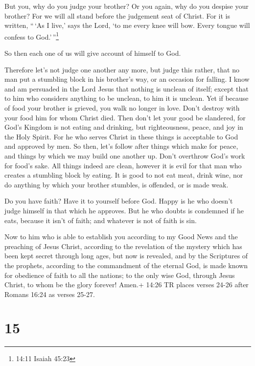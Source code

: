  But you, why do you judge your brother? Or you again, why
do you despise your brother? For we will all stand before the judgement
seat of Christ.  For it is written, ``\,`As I live,' says
the Lord, `to me every knee will bow. Every tongue will confess to
God.'\,''\footnote{14:11 Isaiah 45:23}

 So then each one of us will give account of himself to
God.

 Therefore let's not judge one another any more, but judge
this rather, that no man put a stumbling block in his brother's way, or
an occasion for falling.  I know and am persuaded in the
Lord Jesus that nothing is unclean of itself; except that to him who
considers anything to be unclean, to him it is unclean. 
Yet if because of food your brother is grieved, you walk no longer in
love. Don't destroy with your food him for whom Christ died.
 Then don't let your good be slandered,  for
God's Kingdom is not eating and drinking, but righteousness, peace, and
joy in the Holy Spirit.  For he who serves Christ in these
things is acceptable to God and approved by men.  So then,
let's follow after things which make for peace, and things by which we
may build one another up.  Don't overthrow God's work for
food's sake. All things indeed are clean, however it is evil for that
man who creates a stumbling block by eating.  It is good to
not eat meat, drink wine, nor do anything by which your brother
stumbles, is offended, or is made weak.

 Do you have faith? Have it to yourself before God. Happy
is he who doesn't judge himself in that which he approves. 
But he who doubts is condemned if he eats, because it isn't of faith;
and whatever is not of faith is sin.

 Now to him who is able to establish you according to my
Good News and the preaching of Jesus Christ, according to the revelation
of the mystery which has been kept secret through long ages,
 but now is revealed, and by the Scriptures of the
prophets, according to the commandment of the eternal God, is made known
for obedience of faith to all the nations;  to the only
wise God, through Jesus Christ, to whom be the glory forever! Amen.+
14:26 TR places verses 24-26 after Romans 16:24 as verses 25-27.

\hypertarget{section-14}{%
\section{15}\label{section-14}}

